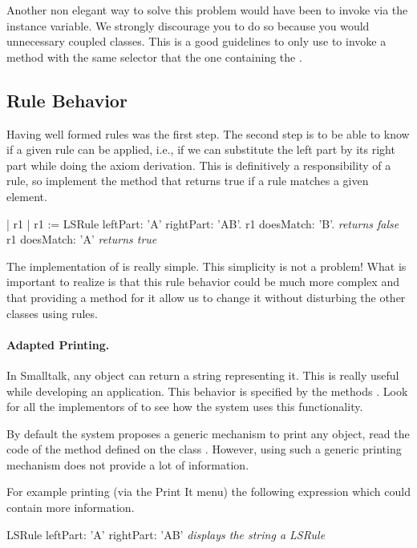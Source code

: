 Another non elegant way to solve this problem would have been to
invoke  via the  instance variable. We strongly
discourage you to do so because you would unnecessary coupled classes.
This is a good guidelines to only use  to invoke a method
with the same selector that the one containing the .


\subsection{Rule Behavior}
Having well formed rules was the first step. The second step is to be
able to know if a given rule can be applied, i.e., if we can
substitute the left part by its right part while doing the axiom
derivation. This is definitively a responsibility of a rule, so
implement the method  that returns true if a
rule matches a given element.

\begin{scriptwithouttitle}
| r1 |
r1 := LSRule leftPart: 'A' rightPart: 'AB'.
r1 doesMatch: 'B'.
\emph{returns false}
r1 doesMatch: 'A'
\emph{returns true}
\end{scriptwithouttitle}

The implementation of  is really simple. This
simplicity is not a problem! What is important to realize is that this
rule behavior could be much more complex and that providing a method
for it allow us to change it without disturbing the other classes using rules.

\paragraph{Adapted Printing.} In Smalltalk, any object can return a string 
representing it.  This is really useful while developing an
application. This behavior is specified by the methods
. Look for all the  implementors of  to see how the system uses this functionality.  

By default the system proposes a generic mechanism to print any
object, read the code of the method  defined on the class . However, using such a generic printing mechanism does not provide a lot of information. 

For example printing (via the Print It menu) the following expression
which could contain more information.
\begin{scriptwithouttitle}
LSRule leftPart: 'A' rightPart: 'AB'
\emph{displays the string a LSRule} 
\end{scriptwithouttitle}

